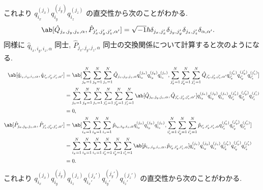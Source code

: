 \documentclass[uplatex,dvipdfmx,a4paper,11pt]{jlreq}
\numberwithin{equation}{section}
\theoremstyle{definition}
\begin{document}
これより $q_{i_x}^{(j_x)}q_{i_y}^{(j_y)}q_{i_z}^{(j_z)}$ の直交性から次のことがわかる.
\begin{align}
  \ab[\hat{Q}_{j_x,j_y,j_z,\alpha}, \hat{P}_{j_x',j_y',j_z',\alpha'}] & = \sqrt{-1}\hbar\delta_{j_x,j_x'}\delta_{j_y,j_y'}\delta_{j_z,j_z'}\delta_{\alpha,\alpha'}.
\end{align}
同様に $\hat{q}_{i_x,i_y,i_z,\alpha}$ 同士, $\hat{P}_{j_x,j_y,j_z,\alpha}$ 同士の交換関係について計算すると次のようになる.
\begin{align}
  \ab[\hat{q}_{i_x,i_y,i_z,\alpha}, \hat{q}_{i_x',i_y',i_z',\alpha'}] & = \ab[\sum_{j_x=1}^{N}\sum_{j_y=1}^{N}\sum_{j_z=1}^{N}\hat{Q}_{j_x,j_y,j_z,\alpha}q_{i_x}^{(j_x)}q_{i_y}^{(j_y)}q_{i_z}^{(j_z)}, \sum_{j_x'=1}^{N}\sum_{j_y'=1}^{N}\sum_{j_z'=1}^{N}\hat{Q}_{j_x',j_y',j_z',\alpha'}q_{i_x'}^{(j_x')}q_{i_y'}^{(j_y')}q_{i_z'}^{(j_z')}] \\
                                                                      & = \sum_{j_x=1}^{N}\sum_{j_y=1}^{N}\sum_{j_z=1}^{N}\sum_{j_x'=1}^{N}\sum_{j_y'=1}^{N}\sum_{j_z'=1}^{N}\ab[\hat{Q}_{j_x,j_y,j_z,\alpha}, \hat{Q}_{j_x',j_y',j_z',\alpha'}]q_{i_x}^{(j_x)}q_{i_y}^{(j_y)}q_{i_z}^{(j_z)}q_{i_x'}^{(j_x')}q_{i_y'}^{(j_y')}q_{i_z'}^{(j_z')} \\
                                                                      & = 0,                                                                                                                                                                                                                                                                     \\
  \ab[\hat{P}_{j_x,j_y,j_z,\alpha}, \hat{P}_{j_x',j_y',j_z',\alpha'}] & = \ab[\sum_{i_x=1}^{N}\sum_{i_y=1}^{N}\sum_{i_z=1}^{N}\hat{p}_{i_x,i_y,i_z,\alpha}q_{i_x}^{(j_x)}q_{i_y}^{(j_y)}q_{i_z}^{(j_z)}, \sum_{i_x'=1}^{N}\sum_{i_y'=1}^{N}\sum_{i_z'=1}^{N}\hat{p}_{i_x',i_y',i_z',\alpha}q_{i_x'}^{(j_x')}q_{i_y'}^{(j_y')}q_{i_z'}^{(j_z')}]  \\
                                                                      & = \sum_{i_x=1}^{N}\sum_{i_y=1}^{N}\sum_{i_z=1}^{N}\sum_{i_x'=1}^{N}\sum_{i_y'=1}^{N}\sum_{i_z'=1}^{N}\ab[\hat{p}_{i_x,i_y,i_z,\alpha}, \hat{p}_{i_x',i_y',i_z',\alpha}]q_{i_x}^{(j_x)}q_{i_y}^{(j_y)}q_{i_z}^{(j_z)}q_{i_x'}^{(j_x')}q_{i_y'}^{(j_y')}q_{i_z'}^{(j_z')}  \\
                                                                      & = 0.
\end{align}
これより $q_{i_x}^{(j_x)}q_{i_y}^{(j_y)}q_{i_z}^{(j_z)}q_{i_x'}^{(j_x')}q_{i_y'}^{(j_y')}q_{i_z'}^{(j_z')}$ の直交性から次のことがわかる.
\end{document}
